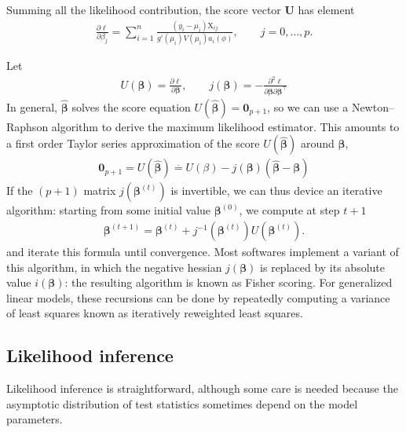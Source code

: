 \documentclass[
  11pt,
  letterpaper,
]{book}
\theoremstyle{definition}
\theoremstyle{definition}
\theoremstyle{definition}
\theoremstyle{remark}
\begin{document}
Summing all the likelihood contribution, the score vector \(\boldsymbol{U}\) has element
\begin{align*}
\frac{\partial \ell}{\partial \beta_j} = \sum_{i=1}^n \frac{(y_i-\mu_i)\mathrm{X}_{ij}}{g'(\mu_i)V(\mu_i)a_i(\phi)}, \qquad j=0, \ldots, p.
\end{align*}

Let
\begin{align*}
U(\boldsymbol{\beta}) = \frac{\partial \ell}{\partial \boldsymbol{\beta}}, \qquad j(\boldsymbol{\beta}) = - \frac{\partial^2 \ell}{\partial \boldsymbol{\beta} \partial \boldsymbol{\beta}^\top}
\end{align*}
In general, \(\widehat{\boldsymbol{\beta}}\) solves the score equation \(U(\widehat{\boldsymbol{\beta}})=\boldsymbol{0}_{p+1}\), so we can use a Newton--Raphson algorithm to derive the maximum likelihood estimator. This amounts to a first order Taylor series approximation of the score \(U(\widehat{\boldsymbol{\beta}})\) around \(\boldsymbol{\beta}\),
\begin{align*}
\boldsymbol{0}_{p+1} = U(\widehat{\boldsymbol{\beta}}) \stackrel{\cdot}{=} U(\beta) - j(\boldsymbol{\beta}) (\widehat{\boldsymbol{\beta}}-\boldsymbol{\beta})
\end{align*}
If the \((p+1)\) matrix \(j(\boldsymbol{\beta}^{(t)})\) is invertible, we can thus device an iterative algorithm: starting from some initial value \(\boldsymbol{\beta}^{(0)}\), we compute at step \(t+1\)
\begin{align*}
\boldsymbol{\beta}^{(t+1)} = \boldsymbol{\beta}^{(t)} + j^{-1}(\boldsymbol{\beta}^{(t)})U(\boldsymbol{\beta}^{(t)}).
\end{align*}
and iterate this formula until convergence.
Most softwares implement a variant of this algorithm, in which the negative hessian \(j(\boldsymbol{\beta})\) is replaced by its absolute value \(i(\boldsymbol{\beta})\): the resulting algorithm is known as Fisher scoring. For generalized linear models, these recursions can be done by repeatedly computing a variance of least squares known as iteratively reweighted least squares.

\hypertarget{likelihood-inference}{%
\subsection{Likelihood inference}\label{likelihood-inference}}

Likelihood inference is straightforward, although some care is needed because the asymptotic distribution of test statistics sometimes depend on the model parameters.
\end{document}
